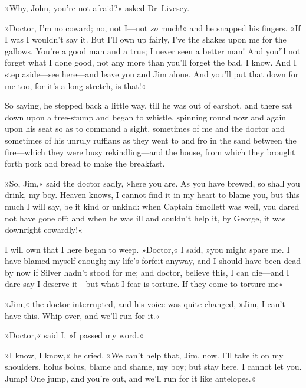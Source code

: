 »Why, John, you're not afraid?« asked Dr~Livesey.

»Doctor, I'm no coward; no, not I—not \textit{so} much!« and he snapped his fingers. »If I was I wouldn't say it. But I'll own up fairly, I've the shakes upon me for the gallows. You're a good man and a true; I never seen a better man! And you'll not forget what I done good, not any more than you'll forget the bad, I know. And I step aside—see here—and leave you and Jim alone. And you'll put that down for me too, for it's a long stretch, is that!«

So saying, he stepped back a little way, till he was out of earshot, and there sat down upon a tree-stump and began to whistle, spinning round now and again upon his seat so as to command a sight, sometimes of me and the doctor and sometimes of his unruly ruffians as they went to and fro in the sand between the fire—which they were busy rekindling—and the house, from which they brought forth pork and bread to make the breakfast.

»So, Jim,« said the doctor sadly, »here you are. As you have brewed, so shall you drink, my boy. Heaven knows, I cannot find it in my heart to blame you, but this much I will say, be it kind or unkind: when Captain Smollett was well, you dared not have gone off; and when he was ill and couldn't help it, by George, it was downright cowardly!«

I will own that I here began to weep. »Doctor,« I said, »you might spare me. I have blamed myself enough; my life's forfeit anyway, and I should have been dead by now if Silver hadn't stood for me; and doctor, believe this, I can die—and I dare say I deserve it—but what I fear is torture. If they come to torture me\longdash«

»Jim,« the doctor interrupted, and his voice was quite changed, »Jim, I can't have this. Whip over, and we'll run for it.«

»Doctor,« said I, »I passed my word.«

»I know, I know,« he cried. »We can't help that, Jim, now. I'll take it on my shoulders, holus bolus, blame and shame, my boy; but stay here, I cannot let you. Jump! One jump, and you're out, and we'll run for it like antelopes.«


